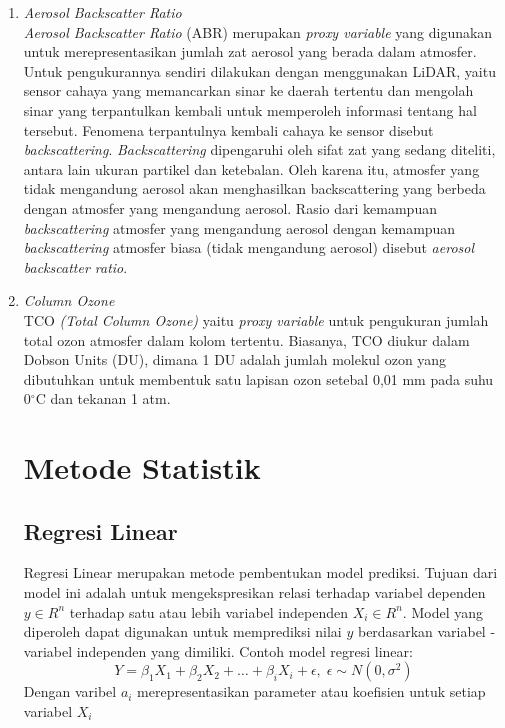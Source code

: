 \begin{enumerate}
    \item \textit{Aerosol Backscatter Ratio}\\
\textit{Aerosol Backscatter Ratio} (ABR) merupakan \textit{proxy variable} yang digunakan untuk merepresentasikan jumlah zat aerosol yang berada dalam atmosfer. Untuk pengukurannya sendiri dilakukan dengan menggunakan LiDAR, yaitu sensor cahaya yang memancarkan sinar ke daerah tertentu dan mengolah sinar yang terpantulkan kembali untuk memperoleh informasi tentang hal tersebut. Fenomena terpantulnya kembali cahaya ke sensor disebut \textit{backscattering}. \textit{Backscattering} dipengaruhi oleh sifat zat yang sedang diteliti, antara lain ukuran partikel dan ketebalan. Oleh karena itu, atmosfer yang tidak mengandung aerosol akan menghasilkan backscattering yang berbeda dengan atmosfer yang mengandung aerosol.
Rasio dari kemampuan \textit{backscattering} atmosfer yang mengandung aerosol dengan kemampuan \textit{backscattering} atmosfer biasa (tidak mengandung aerosol) disebut \textit{aerosol backscatter ratio}.

    \item \textit{Column Ozone} \\
TCO \textit{(Total Column Ozone)} yaitu \textit{proxy variable} untuk pengukuran jumlah total ozon atmosfer dalam kolom tertentu. Biasanya, TCO diukur dalam Dobson Units (DU), dimana 1 DU adalah jumlah molekul ozon yang dibutuhkan untuk membentuk satu lapisan ozon setebal 0,01 mm pada suhu 0$^{\circ}$C dan tekanan 1 atm.



\section{Metode Statistik}
\subsection{Regresi Linear}
Regresi Linear merupakan metode pembentukan model prediksi. Tujuan dari model ini adalah untuk mengekspresikan relasi terhadap variabel dependen $y \in R^n$ terhadap satu atau lebih variabel independen $X_i \in R^n$. Model yang diperoleh dapat digunakan untuk memprediksi nilai $y$ berdasarkan variabel - variabel independen yang dimiliki. Contoh model regresi linear:
\begin{equation*}
    Y = \beta_1X_1 + \beta_2X_2 + \ldots + \beta_iX_i + \epsilon,\;\epsilon \sim N(0, \sigma^2)
\end{equation*}
Dengan varibel $a_i$ merepresentasikan parameter atau koefisien untuk setiap variabel $X_i$

\end{enumerate}
